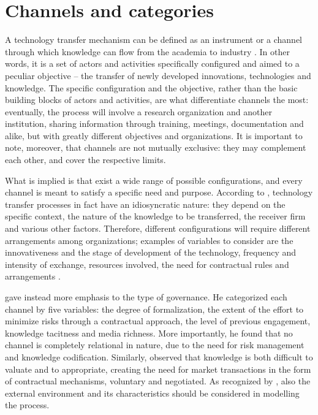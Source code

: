 

\label{Chapter4} %


\section{Channels and categories}

A technology transfer mechanism can be defined as an instrument or a channel through which knowledge can flow from the academia to industry \citep{Gilsing2011}. In other words, it is a set of actors and activities specifically configured and aimed to a peculiar objective – the transfer of newly developed innovations, technologies and knowledge. The specific configuration and the objective, rather than the basic building blocks of actors and activities, are what differentiate channels the most: eventually, the process will involve a research organization and another institution, sharing information through training, meetings, documentation and alike, but with greatly different objectives and organizations. It is important to note, moreover, that channels are not mutually exclusive: they may complement each other, and cover the respective limits.

What is implied is that exist a wide range of possible configurations, and every channel is meant to satisfy a specific need and purpose. According to \citet{DEste2007}, technology transfer processes in fact have an idiosyncratic nature: they depend on the specific context, the nature of the knowledge to be transferred, the receiver firm and various other factors. Therefore, different configurations will require different arrangements among organizations; examples of variables to consider are the innovativeness and the stage of development of the technology, frequency and intensity of exchange, resources involved, the need for contractual rules and arrangements \citep{DEste2007}.

\citet{Alexander2013} gave instead more emphasis to the type of governance. He categorized each channel by five variables: the degree of formalization, the extent of the effort to minimize risks through a contractual approach, the level of previous engagement, knowledge tacitness and media richness. More importantly, he found that no channel is completely relational in nature, due to the need for risk management and knowledge codification. Similarly, \citet{Bercovitz2006} observed that knowledge is both difficult to valuate and to appropriate, creating the need for market transactions in the form of contractual mechanisms, voluntary and negotiated. As recognized by \citet{Rogers2001}, also the external environment and its characteristics should be considered in modelling the process.

